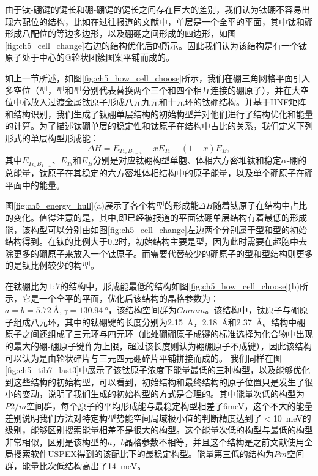由于钛-硼键的键长和硼-硼键的键长之间存在巨大的差别，我们认为钛硼不容易出现六配位的结构，比如在过往报道的文献中，单层是一个全平的平面，其中钛和硼形成八配位的等边多边形，以及硼硼之间形成的四边形，如图\ref{fig:ch5_cell_change}右边的结构优化后的所示。因此我们认为该结构是有一个钛原子处于中心的@轮状团簇图案平铺而成的。

如上一节所述，如图\ref{fig:ch5_how_cell_choose}所示，我们在硼三角网格平面引入多空位（型，型和型分别代表替换两个三个和四个相互连接的硼原子），并在大空位中心放入过渡金属钛原子形成八元九元和十元环的钛硼结构。并基于HNF矩阵和结构识别，我们生成了钛硼单层结构的初始构型并对他们进行了结构优化和能量的计算。为了描述钛硼单层的稳定性和钛原子在结构中占比的关系，我们定义下列形式的单层构型形成能：
\begin{equation}
  \Delta H = E_{Ti_xB_{1-x}} - xE_{Ti} - (1-x)E_{B},
\end{equation}
其中$E_{Ti_xB_{1-x}}$、$E_{Ti}$和$E_B$分别是对应钛硼构型单胞、体相六方密堆钛和稳定$\alpha$-硼的总能量，钛原子在其稳定的六方密堆体相结构中的原子能量，以及单个硼原子在硼平面中的能量。

图\ref{fig:ch5_energy_hull}(a)展示了各个构型的形成能$\Delta H$随着钛原子在结构中占比的变化。值得注意的是，其中,即已经被报道的平面钛硼单层结构有着最低的形成能，该构型可以分别由如图\ref{fig:ch5_cell_change}左边两个分别属于型和型的初始结构得到。在钛的比例大于\num{0.2}时，初始结构主要是型，因为此时需要在超胞中去除更多的硼原子来放入一个钛原子。而需要代替较少的硼原子的型和型结构则更多的是钛比例较少的构型。

在钛硼比为$1:7$的结构中，形成能最低的结构如图\ref{fig:ch5_how_cell_choose}(b)所示，它是一个全平的平面，优化后该结构的晶格参数为：$a=b=\SI{5.72}{\angstrom},\gamma=\SI{130.94}{\degree}$，该结构空间群为$Cmmm$。该结构中，钛原子与硼原子组成八元环，其中的钛硼键的长度分别为\SI{2.15}{\angstrom}，\SI{2.18}{\angstrom}和\SI{2.37}{\angstrom}。结构中硼原子之间还组成了三元环与四元环（此处硼硼原子成键的标准选择为化合物中出现的最大的硼-硼原子键作为上限，超过该长度则认为硼硼原子不成键），因此该结构可以认为是由轮状碎片与三元四元硼碎片平铺拼接而成的。
我们同样在图\ref{fig:ch5_tib7_last3}中展示了该钛原子浓度下能量最低的三种构型，以及能够优化到这些结构的初始构型，可以看到，初始结构和最终结构的原子位置只是发生了很小的变动，说明了我们生成的初始构型的方式是合理的。其中能量次低的构型为$P2/m$空间群，每个原子的平均形成能与最稳定构型相差了6meV，这个不大的能量差别说明我们方法对特定构型势能空间局域极小值的判断精度达到了$<$\SI{10}{\meV}的级别，能够区别搜索能量相差不是很大的构型。这个能量次低的构型与最低的构型非常相似，区别是该构型的$a，b$晶格参数不相等，并且这个结构是之前文献\cite{wang2017semimetallic}使用全局搜索软件USPEX得到的该配比下的最稳定构型。能量第三低的结构为$Pm$空间群，能量比次低结构高出了\SI{14}{\meV}。


